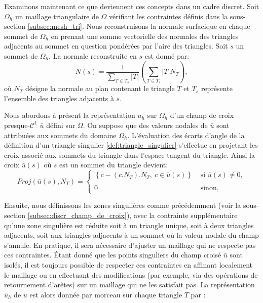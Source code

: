 Examinons maintenant ce que deviennent ces concepts dans un cadre discret. Soit $\Omega_h$ un maillage triangulaire de $\Omega$ vérifiant les contraintes définis dans la sous-section \ref{subsec:mesh_tri}. Nous reconstruisons la normale surfacique en chaque sommet de $\Omega_h$ en prenant une somme vectorielle des normales des triangles adjacents au sommet en question pondérées par l'aire des triangles. Soit $s$ un sommet de $\Omega_h$. La normale reconstruite en $s$ est donné par:
\begin{equation}
N(s)=\displaystyle\frac{1}{\displaystyle\sum_{T\in T_s}|T|}\left(\displaystyle\sum_{T\in T_s}|T|N_T\right),
\end{equation}
où $N_T$ désigne la normale au plan contenant le triangle $T$ et $T_s$ représente l'ensemble des triangles adjacents à $s$.

Nous abordons à présent la représentation $\bar{u}_h$ sur $\Omega_h$ d'un champ de croix presque-$\mathcal{C}^1$ $\bar{u}$ défini sur $\Omega$. On suppose que des valeurs nodales de $\bar{u}$ sont attribuées aux sommets du domaine $\Omega_h$. L'évaluation des écarts d'angle de la définition d'un triangle singulier \ref{def:triangle_singulier} s'effectue en projetant les croix associé aux sommets du triangle dans l'espace tangent du triangle. Ainsi la croix $\bar{u}(s)$ où $s$ est un sommet du triangle devient:
\begin{equation}
Proj(\bar{u}(s), N_T)=
\left\{
\begin{array}{ll}
\displaystyle\left\{c-(c.N_T).N_T,~ c\in\bar{u}(s)\right\} &\mbox{ si }\bar{u}(s)\neq 0,\\\\
0& \text{ sinon},
\end{array}
\right.
\end{equation}

Ensuite, nous définissons les zones singulières comme précédemment (voir la sous-section \ref{subsec:discr_champ_de_croix}), avec la contrainte supplémentaire qu'une zone singulière est réduite soit à un triangle unique, soit à deux triangles adjacents, soit aux triangles adjacents à un sommet où la valeur nodale du champ s'annule. En pratique, il sera nécessaire d'ajuster un maillage qui ne respecte pas ces contraintes. Étant donné que les points singuliers du champ croisé $\bar{u}$ sont isolés, il est toujours possible de respecter ces contraintes en affinant localement le maillage ou en effectuant des modifications (par exemple, via des opérations de retournement d'arêtes) sur un maillage qui ne les satisfait pas. La représentation $\bar{u}_h$ de $u$ est alors donnée par morceau sur chaque triangle $T$ par :\\

